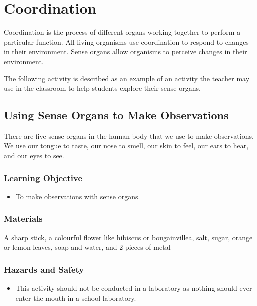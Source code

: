 \section{Coordination}
Coordination is the process of different organs working together to perform a particular function. All living organisms use coordination to respond to changes in their environment. Sense organs allow organisms to perceive changes in their environment.

The following activity is described as an example of an activity the teacher may use in the classroom to help students explore their sense organs.

\subsection{Using Sense Organs to Make Observations}
There are five sense organs in the human body that we use to make observations. We use our tongue to taste, our nose to smell, our skin to feel, our ears to hear, and our eyes to see.

\subsubsection*{Learning Objective}
\begin{itemize}
\item{To make observations with sense organs.}
\end{itemize}

\subsubsection*{Materials}
A sharp stick, a colourful flower like hibiscus or bougainvillea, salt, sugar, orange or lemon leaves, soap and water, and 2 pieces of metal

\subsubsection*{Hazards and Safety}
\begin{itemize}
\item{This activity should not be conducted in a laboratory as nothing should ever enter the mouth in a school laboratory.}
\end{itemize}

